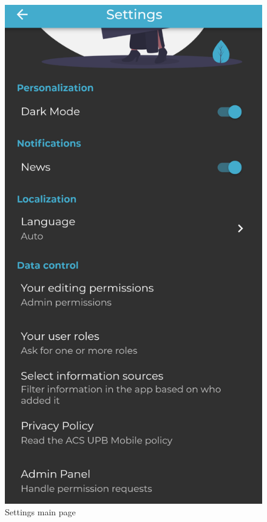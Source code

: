 \begin{figure}[!ht]
    \centering
    \begin{minipage}[b]{0.32\textwidth}
        \captionsetup{justification=centering}
        \includegraphics[width=\textwidth]{figures/app/final/settings-final.png}
        \caption{Settings main page}
        \label{4:fig:settings-page}

\end{minipage}
\end{figure}
